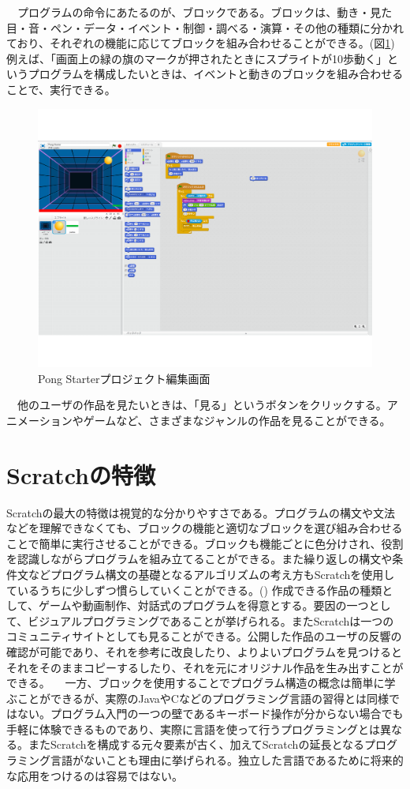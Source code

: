 \documentclass[a4paper,10pt,onecolumn,oneside,openany]{jsbook}
\begin{document}
　プログラムの命令にあたるのが、ブロックである。ブロックは、動き・見た目・音・ペン・データ・イベント・制御・調べる・演算・その他の種類に分かれており、それぞれの機能に応じてブロックを組み合わせることができる。(図\ref{pseditor})例えば、「画面上の緑の旗のマークが押されたときにスプライトが10歩動く」というプログラムを構成したいときは、イベントと動きのブロックを組み合わせることで、実行できる。
 \begin{figure}[!h]
  \centering
   \includegraphics[scale=0.5]{pong_starter_editor.pdf}
  \caption{Pong Starterプロジェクト編集画面}
  \label{pseditor}
 \end{figure}
　他のユーザの作品を見たいときは、「見る」というボタンをクリックする。アニメーションやゲームなど、さまざまなジャンルの作品を見ることができる。
\section{Scratchの特徴}
Scratchの最大の特徴は視覚的な分かりやすさである。プログラムの構文や文法などを理解できなくても、ブロックの機能と適切なブロックを選び組み合わせることで簡単に実行させることができる。ブロックも機能ごとに色分けされ、役割を認識しながらプログラムを組み立てることができる。また繰り返しの構文や条件文などプログラム構文の基礎となるアルゴリズムの考え方もScratchを使用しているうちに少しずつ慣らしていくことができる。(\cite{scratch_article}) 作成できる作品の種類として、ゲームや動画制作、対話式のプログラムを得意とする。要因の一つとして、ビジュアルプログラミングであることが挙げられる。またScratchは一つのコミュニティサイトとしても見ることができる。公開した作品のユーザの反響の確認が可能であり、それを参考に改良したり、よりよいプログラムを見つけるとそれをそのままコピーするしたり、それを元にオリジナル作品を生み出すことができる。
　一方、ブロックを使用することでプログラム構造の概念は簡単に学ぶことができるが、実際のJavaやCなどのプログラミング言語の習得とは同様ではない。プログラム入門の一つの壁であるキーボード操作が分からない場合でも手軽に体験できるものであり、実際に言語を使って行うプログラミングとは異なる。またScratchを構成する元々要素が古く、加えてScratchの延長となるプログラミング言語がないことも理由に挙げられる。独立した言語であるために将来的な応用をつけるのは容易ではない。
\end{document}
